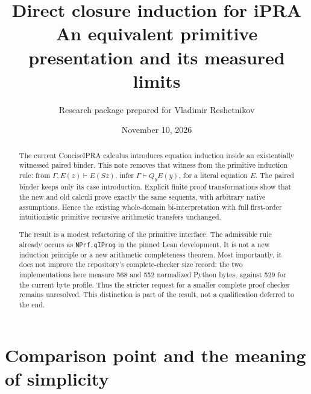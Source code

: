 \documentclass[11pt]{article}
\title{\textbf{Direct closure induction for iPRA}\\[5pt]
  \large An equivalent primitive presentation and its measured limits}
\author{Research package prepared for Vladimir Reshetnikov}
\date{November 10, 2026}
\theoremstyle{definition}
\begin{document}
\maketitle
\thispagestyle{empty}

\begin{abstract}
The current ConciseIPRA calculus introduces equation induction inside an
existentially witnessed paired binder. This note removes that witness from
the primitive induction rule: from $\Gamma,E(z)\vdash E(Sz)$, infer
$\Gamma\vdash Q_yE(y)$, for a literal equation $E$. The paired binder keeps
only its case introduction. Explicit finite proof transformations show that
the new and old calculi prove exactly the same sequents, with arbitrary native
assumptions. Hence the existing whole-domain bi-interpretation with full
first-order intuitionistic primitive recursive arithmetic transfers unchanged.

The result is a modest refactoring of the primitive interface. The admissible
rule already occurs as \texttt{NPrf.qIProg} in the pinned Lean development.
It is not a new induction principle or a new arithmetic completeness theorem.
Most importantly, it does not improve the repository's complete-checker size
record: the two implementations here measure 568 and 552 normalized Python
bytes, against 529 for the current byte profile. Thus the stricter request for
a smaller complete proof checker remains unresolved. This distinction is
part of the result, not a qualification deferred to the end.
\end{abstract}

\vspace{4pt}
\begin{center}
\end{center}

\clearpage
\tableofcontents
\clearpage

\section{Comparison point and the meaning of simplicity}
\end{document}
